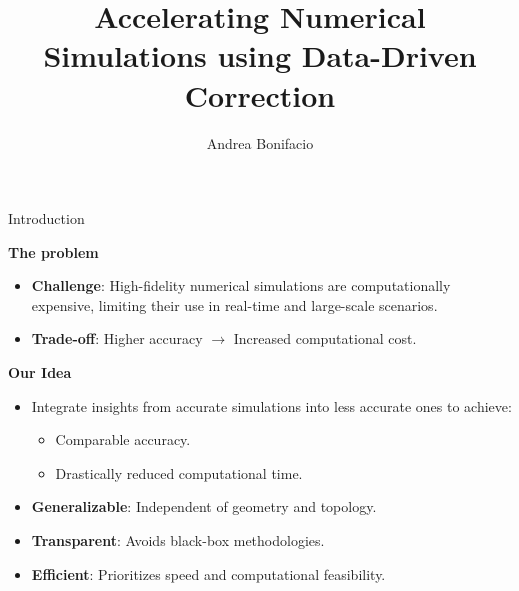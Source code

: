 \documentclass{beamer}
\title{Accelerating Numerical Simulations using Data-Driven Correction}
\author{Andrea Bonifacio}
\date{}
\begin{document}
\begin{frame}
\titlepage
\end{frame}


\begin{frame}{Introduction}

    \textbf{The problem}
    \begin{itemize}
        \item \textbf{Challenge}: High-fidelity numerical simulations are computationally expensive, limiting their use in real-time and large-scale scenarios.
        \item \textbf{Trade-off}: Higher accuracy $\rightarrow$ Increased computational cost.
    \end{itemize}
    
    \vspace{0.5cm}
    
    \textbf{Our Idea}
    \begin{itemize}
        \item Integrate insights from accurate simulations into less accurate ones to achieve:
        \begin{itemize}
            \item Comparable accuracy.
            \item Drastically reduced computational time.
        \end{itemize}
        \item \textbf{Generalizable}: Independent of geometry and topology.
        \item \textbf{Transparent}: Avoids black-box methodologies.
        \item \textbf{Efficient}: Prioritizes speed and computational feasibility.
    \end{itemize}
    
    \vspace{0.5cm}
    
    \end{frame}

\end{document}
